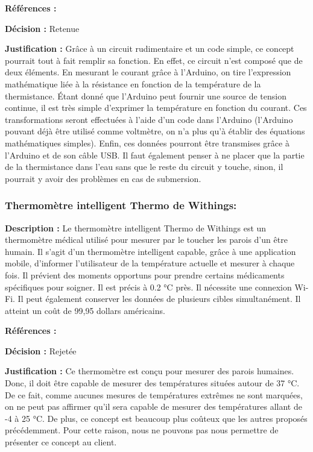 \textbf{Références :} \cite{TuAr} \cite{DaTh} \cite{AmAr}

\textbf{Décision :} Retenue

\textbf{Justification :} Grâce à un circuit rudimentaire et un code simple, ce concept pourrait tout à fait remplir sa fonction. En effet, ce circuit n’est composé que de deux éléments. En mesurant le courant grâce à l’Arduino, on tire l’expression mathématique liée à la résistance en fonction de la température de la thermistance. Étant donné que l’Arduino peut fournir une source de tension continue, il est très simple d’exprimer la température en fonction du courant. Ces transformations seront effectuées à l’aide d’un code dans l’Arduino (l’Arduino pouvant déjà être utilisé comme voltmètre, on n’a plus qu’à établir des équations mathématiques simples). Enfin, ces données pourront être transmises grâce à l’Arduino et de son câble USB. Il faut également penser à ne placer que la partie de la thermistance dans l'eau sans que le reste du circuit y touche, sinon, il pourrait y avoir des problèmes en cas de submersion.

\subsubsection{Thermomètre intelligent Thermo de Withings:}

\textbf{Description :} Le thermomètre intelligent Thermo de Withings est un thermomètre médical utilisé pour mesurer par le toucher les parois d’un être humain. Il s’agit d’un thermomètre intelligent capable, grâce à une application mobile, d’informer l’utilisateur de la température actuelle et mesurer à chaque fois. Il prévient des moments opportuns pour prendre certains médicaments spécifiques pour soigner. Il est précis à 0.2 °C près. Il nécessite une connexion Wi-Fi. Il peut également conserver les données de plusieurs cibles simultanément. Il atteint un coût de 99,95 dollars américains.

\textbf{Références :} \cite{Thermo}

\textbf{Décision :} Rejetée

\textbf{Justification :} Ce thermomètre est conçu pour mesurer des parois humaines. Donc, il doit être capable de mesurer des températures situées autour de 37 °C. De ce fait, comme aucunes mesures de températures extrêmes ne sont marquées, on ne peut pas affirmer qu’il sera capable de mesurer des températures allant de -4 à 25 °C. De plus, ce concept est beaucoup plus coûteux que les autres proposés précédemment. Pour cette raison, nous ne pouvons pas nous permettre de présenter ce concept au client. 

